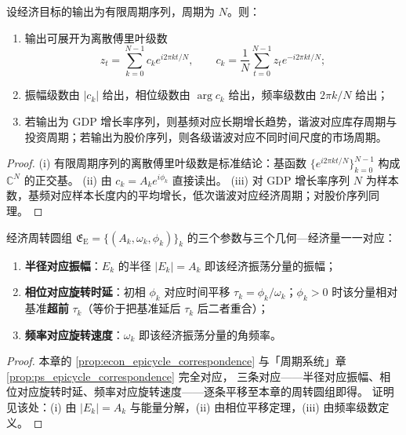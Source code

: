 \begin{theorem}[由经济数据构建周期级数]\label{thm:econ_series_reconstruction}
设经济目标的输出为有限周期序列，周期为 $N$。则：
\begin{enumerate}[label=(\roman*)]
    \item 输出可展开为离散傅里叶级数
    \[
    z_t=\sum_{k=0}^{N-1}c_k e^{i2\pi kt/N},\qquad
    c_k=\frac1N\sum_{t=0}^{N-1}z_t e^{-i2\pi kt/N};
    \]
    \item 振幅级数由 $|c_k|$ 给出，相位级数由 $\arg c_k$ 给出，频率级数由 $2\pi k/N$ 给出；
    \item 若输出为 GDP 增长率序列，则基频对应长期增长趋势，谐波对应库存周期与投资周期；若输出为股价序列，则各级谐波对应不同时间尺度的市场周期。
\end{enumerate}
\end{theorem}

\begin{proof}
(i) 有限周期序列的离散傅里叶级数是标准结论：基函数 $\{e^{i2\pi kt/N}\}_{k=0}^{N-1}$ 构成 $\mathbb C^N$ 的正交基。
(ii) 由 $c_k=A_k e^{i\phi_k}$ 直接读出。
(iii) 对 GDP 增长率序列 $N$ 为样本数，基频对应样本长度内的平均增长，低次谐波对应经济周期；对股价序列同理。
\end{proof}

\begin{proposition}\label{prop:econ_epicycle_correspondence}
经济周转圆组 $\mathfrak E_{\mathrm{E}}=\{(A_k,\omega_k,\phi_k)\}_{k}$ 的三个参数与三个几何—经济量一一对应：
\begin{enumerate}[label=(\roman*)]
    \item \textbf{半径对应振幅}：$E_k$ 的半径 $|E_k|=A_k$ 即该经济振荡分量的振幅；
    \item \textbf{相位对应旋转时延}：初相 $\phi_k$ 对应时间平移 $\tau_k=\phi_k/\omega_k$；$\phi_k>0$ 时该分量相对基准\textbf{超前} $\tau_k$（等价于把基准延后 $\tau_k$ 后二者重合）；
    \item \textbf{频率对应旋转速度}：$\omega_k$ 即该经济振荡分量的角频率。
\end{enumerate}
\end{proposition}

\begin{proof}
本章的 \cref{prop:econ_epicycle_correspondence} 与「周期系统」章 \cref{prop:ps_epicycle_correspondence} 完全对应，
三条对应——半径对应振幅、相位对应旋转时延、频率对应旋转速度——逐条平移至本章的周转圆组即得。
证明见该处：(i) 由 $|E_k|=A_k$ 与能量分解，(ii) 由相位平移定理，(iii) 由频率级数定义。
\end{proof}

